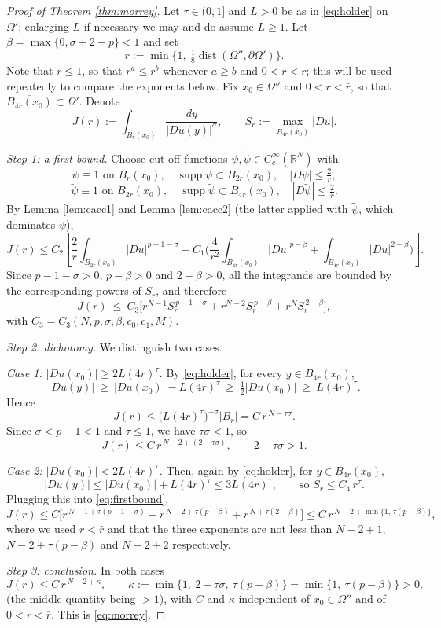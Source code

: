 \documentclass[reqno]{amsart}
\theoremstyle{plain}
\theoremstyle{definition}
\theoremstyle{remark}
\newcommand{\R}{\mathbb{R}}
\newcommand{\dist}{\operatorname{dist}}
\newcommand{\supp}{\operatorname{supp}}
\begin{document}
\begin{proof}[Proof of Theorem \ref{thm:morrey}]
Let $\tau\in(0,1]$ and $L>0$ be as in \eqref{eq:holder} on $\overline{\Omega'}$; enlarging $L$ if
necessary we may and do assume $L\ge1$. Let $\beta=\max\{0,\sigma+2-p\}<1$ and set
\[
\bar r:=\min\Big\{1,\ \tfrac18\dist(\Omega'',\partial\Omega')\Big\} .
\]
Note that $\bar r\le1$, so that $r^{a}\le r^{b}$ whenever $a\ge b$ and $0<r<\bar r$; this will be used
repeatedly to compare the exponents below. Fix $x_0\in\Omega''$ and $0<r<\bar r$, so that $\overline{B_{4r}(x_0)}\subset\Omega'$. Denote
\[
J(r):=\int_{B_r(x_0)}\frac{dy}{|Du(y)|^{\sigma}},\qquad
S_r:=\max_{\overline{B_{4r}(x_0)}}|Du| .
\]

\emph{Step 1: a first bound.} Choose cut-off functions $\psi,\tilde\psi\in C_c^\infty(\R^N)$ with
\[
\psi\equiv1\text{ on }B_r(x_0),\quad \supp\psi\subset B_{2r}(x_0),\quad|D\psi|\le\tfrac2r,
\]
\[
\tilde\psi\equiv1\text{ on }B_{2r}(x_0),\quad \supp\tilde\psi\subset B_{4r}(x_0),\quad|D\tilde\psi|\le\tfrac2r .
\]
By Lemma \ref{lem:cacc1} and Lemma \ref{lem:cacc2} (the latter applied with $\tilde\psi$, which
dominates $\psi$),
\[
J(r)\le C_2\left[\frac2r\int_{B_{2r}(x_0)}|Du|^{p-1-\sigma}
+C_1\Big(\frac{4}{r^2}\int_{B_{4r}(x_0)}|Du|^{p-\beta}+\int_{B_{4r}(x_0)}|Du|^{2-\beta}\Big)\right].
\]
Since $p-1-\sigma>0$, $p-\beta>0$ and $2-\beta>0$, all the integrands are bounded by the
corresponding powers of $S_r$, and therefore
\begin{equation}\label{eq:firstbound}
J(r)\ \le\ C_3\Big[r^{N-1}S_r^{\,p-1-\sigma}+r^{N-2}S_r^{\,p-\beta}+r^{N}S_r^{\,2-\beta}\Big],
\end{equation}
with $C_3=C_3(N,p,\sigma,\beta,c_0,c_1,M)$.

\emph{Step 2: dichotomy.} We distinguish two cases.

\emph{Case 1: $|Du(x_0)|\ge 2L(4r)^{\tau}$.} By \eqref{eq:holder}, for every $y\in B_{4r}(x_0)$,
\[
|Du(y)|\ \ge\ |Du(x_0)|-L(4r)^{\tau}\ \ge\ \tfrac12|Du(x_0)|\ \ge\ L(4r)^{\tau}.
\]
Hence
\[
J(r)\le\big(L(4r)^{\tau}\big)^{-\sigma}|B_r|=C\,r^{\,N-\tau\sigma}.
\]
Since $\sigma<p-1<1$ and $\tau\le1$, we have $\tau\sigma<1$, so
\[
J(r)\le C\,r^{\,N-2+(2-\tau\sigma)},\qquad 2-\tau\sigma>1 .
\]

\emph{Case 2: $|Du(x_0)|<2L(4r)^{\tau}$.} Then, again by \eqref{eq:holder}, for $y\in B_{4r}(x_0)$,
\[
|Du(y)|\le|Du(x_0)|+L(4r)^{\tau}\le 3L(4r)^{\tau},\qquad\text{so } S_r\le C_4\,r^{\tau} .
\]
Plugging this into \eqref{eq:firstbound},
\[
J(r)\le C\Big[r^{\,N-1+\tau(p-1-\sigma)}+r^{\,N-2+\tau(p-\beta)}+r^{\,N+\tau(2-\beta)}\Big]
\le C\,r^{\,N-2+\min\{1,\,\tau(p-\beta)\}},
\]
where we used $r<\bar r$ and that the three exponents are not less than $N-2+1$, $N-2+\tau(p-\beta)$ and
$N-2+2$ respectively.

\emph{Step 3: conclusion.} In both cases
\[
J(r)\le C\,r^{\,N-2+\kappa},\qquad \kappa:=\min\{1,\ 2-\tau\sigma,\ \tau(p-\beta)\}
=\min\{1,\ \tau(p-\beta)\}>0 ,
\]
(the middle quantity being $>1$), with $C$ and $\kappa$ independent of $x_0\in\Omega''$ and of
$0<r<\bar r$. This is \eqref{eq:morrey}.
\end{proof}
\end{document}
